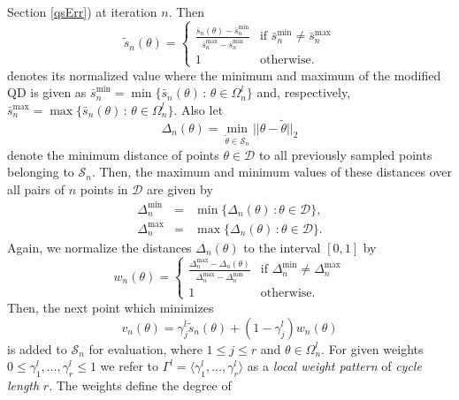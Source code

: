 \documentclass[article, nojss]{jss}
\numberwithin{equation}{section}			%
\newcommand{\Sample}{\mathcal{S}}
\newcommand{\D}{\mathcal{D}}
\begin{document}
Section \ref{qsErr}) at iteration $n$. Then
\begin{equation}\label{stilde}
 \tilde{s}_n(\theta) = 
  \begin{cases} 
   \frac{\bar{s}_n(\theta)-\bar{s}^{\textrm{min}}_n}{\bar{s}^{\textrm{max}}_n-\bar{s}^{\textrm{min}}_n}
   & \textrm{if } \bar{s}^{\textrm{min}}_n\neq \bar{s}^{\textrm{max}}_n \\ 1 &
   \textrm{otherwise}.
  \end{cases}
\end{equation}
denotes its normalized value where the minimum and maximum
of the modified QD is given as
$\bar{s}^{\textrm{min}}_n=\min\{\bar{s}_n(\theta)\,:\,\theta\in\Omega^l_n\}$ and, respectively,
$\bar{s}^{\textrm{max}}_n=\max\{\bar{s}_n(\theta)\,:\,\theta\in\Omega^l_n\}$.
Also let
\begin{equation*}
 \Delta_n(\theta)=\min_{\tilde{\theta}\in\Sample_n} ||\theta-\tilde{\theta}||_{2}  
\end{equation*}
denote the minimum distance of points $\theta\in\D$ to all previously sampled
points belonging to $\Sample_n$. Then, the maximum and minimum values of these
distances over all pairs of $n$ points in $\D$ are given by
\begin{eqnarray*}
  \Delta^{\textrm{min}}_n & = & \min\{\Delta_n(\theta)\,:\theta\in\mathcal{D}\},\\
  \Delta^{\textrm{max}}_n & = & \max\{\Delta_n(\theta)\,:\theta\in\mathcal{D}\}.     
\end{eqnarray*}
Again, we normalize the distances $\Delta_n(\theta)$ to the interval $[0,1]$ by
\begin{equation*}
 w_n(\theta) = 
  \begin{cases} 
   \frac{\Delta^{\textrm{max}}_n-\Delta_n(\theta)}{\Delta^{\textrm{max}}_n-\Delta^{\textrm{min}}_n}
   & \textrm{if } \Delta^{\textrm{min}}_n\neq \Delta^{\textrm{max}}_n \\ 1 &
   \textrm{otherwise}.
  \end{cases}
\end{equation*}
Then, the next point which minimizes 
\begin{equation}\label{scoreCrit}
  v_n(\theta)=\gamma^l_j \tilde{s}_n(\theta)+(1-\gamma^l_j)w_n(\theta)
\end{equation}
is added to $\Sample_n$ for evaluation, where $1\leq j\leq r$ and
$\theta\in\Omega^l_n$. For given weights $0\leq \gamma^l_1,\ldots,\gamma^l_r\leq 1$ we refer to
$\Gamma^l=\langle \gamma^l_1,\ldots,\gamma^l_r\rangle$ as a \emph{local weight
pattern} of \emph{cycle length} $r$. The weights define the degree of
\end{document}
